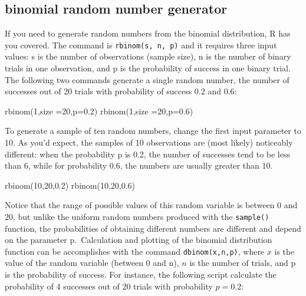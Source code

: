 \documentclass[
  letterpaper,
  DIV=11,
  numbers=noendperiod]{scrreprt}
\newenvironment{Shaded}{\begin{snugshade}}{\end{snugshade}}
\newcommand{\NormalTok}[1]{\textcolor[rgb]{0.00,0.23,0.31}{#1}}
\begin{document}
\hypertarget{binomial-random-number-generator}{%
\subsection*{binomial random number
generator}\label{binomial-random-number-generator}}

If you need to generate random numbers from the binomial distribution, R
has you covered. The command is \texttt{rbinom(s,\ n,\ p)} and it
requires three input values: s is the number of observations (sample
size), n is the number of binary trials in one observation, and p is the
probability of success in one binary trial. The following two commands
generate a single random number, the number of successes out of 20
trials with probability of success 0.2 and 0.6:

\begin{Shaded}
\begin{Highlighting}[]
\NormalTok{rbinom(1,size =20,p=0.2)}
\NormalTok{rbinom(1,size =20,p=0.6)}
\end{Highlighting}
\end{Shaded}

To generate a sample of ten random numbers, change the first input
parameter to 10. As you'd expect, the samples of 10 observations are
(most likely) noticeably different: when the probability p is 0.2, the
number of successes tend to be less than 6, while for probability 0.6,
the numbers are usually greater than 10.

\begin{Shaded}
\begin{Highlighting}[]
\NormalTok{rbinom(10,20,0.2)}
\NormalTok{rbinom(10,20,0.6)}
\end{Highlighting}
\end{Shaded}

Notice that the range of possible values of this random variable is
between 0 and 20, but unlike the uniform random numbers produced with
the \texttt{sample()} function, the probabilities of obtaining different
numbers are different and depend on the parameter p.~Calculation and
plotting of the binomial distribution function can be accomplishes with
the command \texttt{dbinom(x,n,p)}, where \(x\) is the value of the
random variable (between 0 and n), \(n\) is the number of trials, and p
is the probability of success. For instance, the following script
calculate the probability of 4 successes out of 20 trials with
probability \(p=0.2\):
\end{document}
